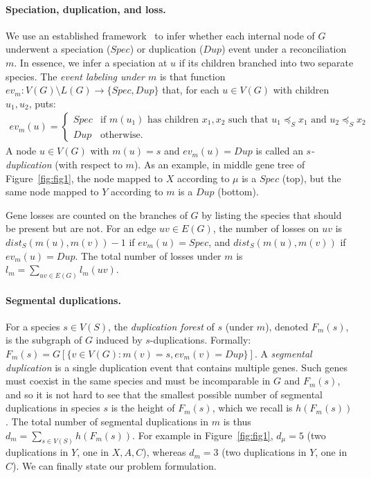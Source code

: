 \documentclass[10pt]{article}
\begin{document}
\paragraph{Speciation, duplication, and loss.}
We use an established framework~\cite{gorecki2006dls,zhang1997mirkin} to infer whether each internal node of $G$ underwent a speciation ($Spec$) or duplication ($Dup$) event under a reconciliation $m$.  In essence, we infer a speciation at $u$ if its children branched into two separate species.
The \emph{event labeling under $m$} is that function $ev_m : V(G) \setminus L(G) \rightarrow \{Spec, Dup\}$ that, for each $u \in V(G)$ with children $u_1, u_2$, puts:
\begin{align*}
    ev_m(u) = \begin{cases}
        Spec & \mbox{if $m(u_1)$ has children $x_1, x_2$ such that } \mbox{$u_1 \preceq_S x_1$ and $u_2 \preceq_S x_2$}\\
        Dup &\mbox{otherwise.}
    \end{cases}
\end{align*}
A node $u \in V(G)$ with $m(u) = s$ and $ev_m(u) = Dup$ is called an \emph{$s$-duplication} (with respect to $m$).
As an example, in middle gene tree of Figure~\ref{fig:fig1}, the node mapped to $X$ according to $\mu$ is a $Spec$ (top), but the same node mapped to $Y$ according to $m$ is a $Dup$ (bottom).

Gene losses are counted on the branches of $G$ by listing the species that should be present but are not.  For an edge $uv \in E(G)$, the number of losses on $uv$ is $dist_S(m(u), m(v)) - 1$ if $ev_m(u) = Spec$, and $dist_S(m(u), m(v))$ if $ev_m(u) = Dup$. 
The total number of losses under $m$ is
$l_m = \sum_{uv \in E(G)} l_m(uv)$.






\paragraph{Segmental duplications.}
For a species $s \in V(S)$, the \emph{duplication forest} of $s$ (under $m$), denoted $F_m(s)$, is the subgraph of $G$ induced by $s$-duplications.  Formally: 
$F_m(s) = G[ \{v \in V(G) : m(v) = s, ev_m(v) = Dup\}]$.
A \emph{segmental duplication} is a single duplication event that contains multiple genes.  Such genes must coexist in the same species and must be incomparable in $G$ and $F_m(s)$, and so it is not hard to see that 
the smallest possible number of segmental duplications in species $s$ is the height of $F_m(s)$, which we recall is $h(F_m(s))$.  The total number of segmental duplications in $m$ is thus 
$d_m = \sum_{s \in V(S)} h(F_m(s))$.
For example in Figure~\ref{fig:fig1}, $d_{\mu} = 5$ (two duplications in $Y$, one in $X, A, C$), whereas $d_m = 3$ (two duplications in $Y$, one in $C$).
We can finally state our problem formulation.
\end{document}
